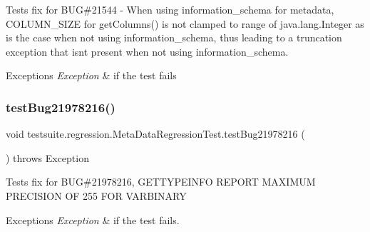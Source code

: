 Tests fix for B\+UG\#21544 -\/ When using information\+\_\+schema for metadata, C\+O\+L\+U\+M\+N\+\_\+\+S\+I\+ZE for get\+Columns() is not clamped to range of java.\+lang.\+Integer as is the case when not using information\+\_\+schema, thus leading to a truncation exception that isn\textquotesingle{}t present when not using information\+\_\+schema.


\begin{DoxyExceptions}{Exceptions}
{\em Exception} & if the test fails \\
\hline
\end{DoxyExceptions}
\mbox{\label{classtestsuite_1_1regression_1_1_meta_data_regression_test_a375e1a8c67204d8fcbbca1bd9957881d}} 
\subsubsection{\texorpdfstring{test\+Bug21978216()}{testBug21978216()}}
{\footnotesize\ttfamily void testsuite.\+regression.\+Meta\+Data\+Regression\+Test.\+test\+Bug21978216 (\begin{DoxyParamCaption}{ }\end{DoxyParamCaption}) throws Exception}

Tests fix for B\+UG\#21978216, G\+E\+T\+T\+Y\+P\+E\+I\+N\+FO R\+E\+P\+O\+RT M\+A\+X\+I\+M\+UM P\+R\+E\+C\+I\+S\+I\+ON OF 255 F\+OR V\+A\+R\+B\+I\+N\+A\+RY


\begin{DoxyExceptions}{Exceptions}
{\em Exception} & if the test fails. \\
\hline
\end{DoxyExceptions}
\mbox{\label{classtestsuite_1_1regression_1_1_meta_data_regression_test_a5b7642788b0d18aad6874a2770cfdf5d}} 
